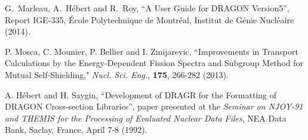 \begin{thebibliography}{20}

G.~Marleau, A.~H\'ebert and R.~Roy,  
``A User Guide for DRAGON Version5'',  Report IGE-335, \'Ecole Polytechnique de Montr\'eal,
Institut de G\'enie Nucl\'eaire (2014). 

P. Mosca, C. Mounier, P. Bellier and I. Zmijarevic, ``Improvements in Transport Calculations
by the Energy-Dependent Fission Spectra and Subgroup Method for Mutual Self-Shielding,"
{\sl Nucl. Sci. Eng.}, {\bf 175}, 266-282 (2013).

A. H\'ebert and H. Saygin, ``Development of DRAGR for the Formatting of DRAGON
Cross-section Libraries'', paper presented at the {\sl Seminar on NJOY-91 and
THEMIS for the Processing of Evaluated Nuclear Data Files}, NEA Data Bank,
Saclay, France, April 7-8 (1992).

\end{thebibliography}
